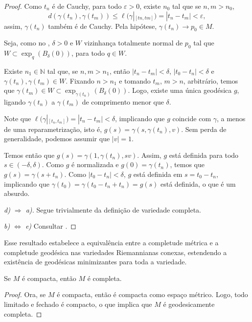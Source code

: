 \begin{theorem}
\begin{proof}
        Como $t_n$ é de Cauchy, para todo $\varepsilon > 0$, existe $n_0$ tal que se $n, m > n_0$,
        \begin{equation*}
            d(\gamma(t_n), \gamma(t_m)) \leq \ell(\gamma|_{[tn,tm]})= |t_n - t_m| < \varepsilon,
        \end{equation*}
        assim, $\gamma(t_n)$ também é de Cauchy. Pela hipótese, $\gamma(t_n) \to p_0 \in M$.

        Seja, como no , $\delta > 0$ e $W$ vizinhança totalmente normal de $p_0$ tal que $W \subset \exp_q(B_\delta(0))$, para todo $q \in W$.

        Existe $n_1 \in \mathbb{N}$ tal que, se $n, m > n_1$, então $|t_n - t_m| < \delta$, $|t_{0}-t_{n}|<\delta$ e $\gamma(t_n), \gamma(t_m) \in W$.
        Fixando $n > n_1$ e tomando $t_m$, $m > n$, arbitrário, temos que $\gamma(t_m) \in W \subset \exp_{\gamma(t_n)}(B_\delta(0))$. Logo, existe uma única geodésica $g$, ligando $\gamma(t_n)$ a $\gamma(t_m)$ de comprimento menor que $\delta$.

        Note que $\ell(\gamma|_{[t_n, t_m]}) = |t_n - t_m| < \delta$, implicando que $g$ coincide com $\gamma$, a menos de uma reparametrização, isto é, $g(s) = \gamma(s, \gamma(t_n), v)$. Sem perda de generalidade, podemos assumir que $|v| = 1$.

        Temos então que $g(s) = \gamma(1, \gamma(t_n), sv)$. Assim, $g$ está definida para todo $s \in (-\delta, \delta)$.
        Como $g$ é normalizada e $g(0) = \gamma(t_n)$, temos que $g(s) = \gamma(s + t_n)$.
        Como $|t_0 - t_n| < \delta$, $g$ está definida em $s = t_0 - t_n$, implicando que $\gamma(t_0) = \gamma(t_0 - t_n + t_n) = g(s)$ está definida, o que é um absurdo.

        \emph{d) $\Rightarrow$ a).} Segue trivialmente da definição de variedade completa.

        \emph{b) $\iff$ e)} Consultar \textcite{doCarmo1992}.
    \end{proof}
\end{theorem}
Esse resultado estabelece a equivalência entre a completude métrica e a completude geodésica nas variedades Riemannianas conexas, estendendo a existência de geodésicas minimizantes para toda a variedade.
\begin{corollary}
    \label{cor:compacidade-completude}
    Se $M$ é compacta, então $M$ é completa.
    \begin{proof}

        Ora, se $M$ é compacta, então é compacta como espaço métrico. Logo, todo limitado e fechado é compacto, o que implica que $M$ é geodesicamente completa.
    \end{proof}
\end{corollary}
